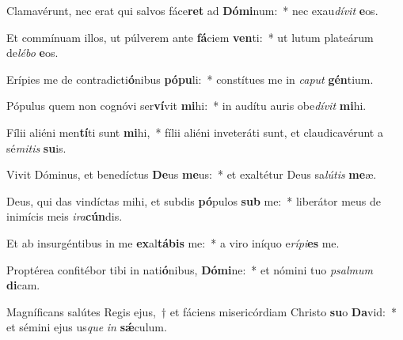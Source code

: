 \item Clamavérunt, nec erat qui salvos fáce\textbf{ret} ad \textbf{Dó}\textbf{mi}num:~* nec exau\textit{dí}\textit{vit} \textbf{e}os.
\item Et commínuam illos, ut púlverem ante \textbf{fá}ciem \textbf{ven}ti:~* ut lutum plateárum de\textit{lé}\textit{bo} \textbf{e}os.
\item Erípies me de contradicti\textbf{ó}nibus \textbf{pó}\textbf{pu}li:~* constítues me in \textit{ca}\textit{put} \textbf{gén}tium.
\item Pópulus quem non cognóvi ser\textbf{ví}vit \textbf{mi}hi:~* in audítu auris obe\textit{dí}\textit{vit} \textbf{mi}hi.
\item Fílii aliéni men\textbf{tí}ti sunt \textbf{mi}hi,~* fílii aliéni inveteráti sunt, et claudicavérunt a sé\textit{mi}\textit{tis} \textbf{su}is.
\item Vivit Dóminus, et benedíctus \textbf{De}us \textbf{me}us:~* et exaltétur Deus sa\textit{lú}\textit{tis} \textbf{me}æ.
\item Deus, qui das vindíctas mihi, et subdis \textbf{pó}pulos \textbf{sub} me:~* liberátor meus de inimícis meis \textit{i}\textit{ra}\textbf{cún}dis.
\item Et ab insurgéntibus in me \textbf{ex}al\textbf{tá}\textbf{bis} me:~* a viro iníquo e\textit{rí}\textit{pi}\textbf{es} me.
\item Proptérea confitébor tibi in nati\textbf{ó}nibus, \textbf{Dó}\textbf{mi}ne:~* et nómini tuo \textit{psal}\textit{mum} \textbf{di}cam.
\item Magníficans salútes Regis ejus,~† et fáciens misericórdiam Christo \textbf{su}o \textbf{Da}vid:~* et sémini ejus us\textit{que} \textit{in} \textbf{sǽ}culum.
